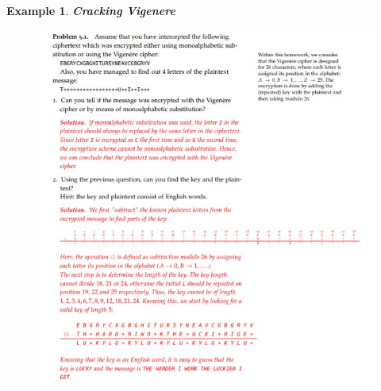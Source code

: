 \documentclass[titlepage]{article}
\newtheorem{example}{Example}[section]
\begin{document}
\begin{example}\textbf{Cracking Vigenere}
\begin{figure}[H]
    \centering
    \includegraphics{src/vig.JPG}

    \label{fig:my_label}
\end{figure}
\end{example}
\end{document}
